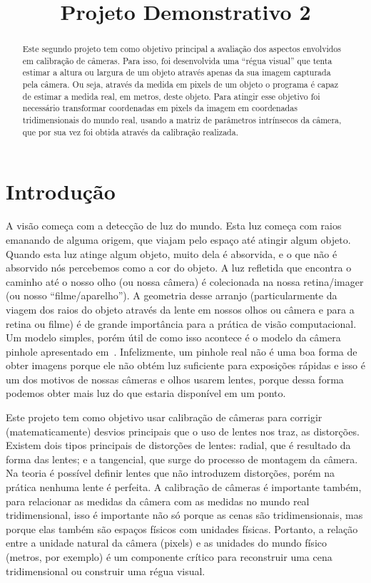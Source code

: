 \documentclass{bmvc2k}
\title{Projeto Demonstrativo 2}
\begin{document}
\maketitle

\begin{abstract}
Este segundo projeto tem como objetivo principal a avaliação dos aspectos envolvidos em calibração de câmeras. Para isso, foi desenvolvida uma ``régua visual'' que tenta estimar a altura ou largura de um objeto através apenas da sua imagem capturada pela câmera. Ou seja, através da medida em pixels de um objeto o programa é capaz de estimar a medida real, em metros, deste objeto. Para atingir esse objetivo foi necessário transformar coordenadas em pixels da imagem em coordenadas tridimensionais do mundo real, usando a matriz de parâmetros intrínsecos da câmera, que por sua vez foi obtida através da calibração realizada.
\end{abstract}

\section{Introdução}
\label{sec:intro}
A visão começa com a detecção de luz do mundo. Esta luz começa com raios emanando de alguma origem, que viajam pelo espaço até atingir algum objeto. Quando esta luz atinge algum objeto, muito dela é absorvida, e o que não é absorvido nós percebemos como a cor do objeto. A luz refletida que encontra o caminho até o nosso olho (ou nossa câmera) é colecionada na nossa retina/imager (ou nosso ``filme/aparelho''). A geometria desse arranjo (particularmente da viagem dos raios do objeto através da lente em nossos olhos ou câmera e para a retina ou filme) é de grande importância para a prática de visão computacional. Um modelo simples, porém útil de como isso acontece é o modelo da câmera pinhole apresentado em~\cite{Hartley}. Infelizmente, um pinhole real não é uma boa forma de obter imagens porque ele não obtém luz suficiente para exposições rápidas e isso é um dos motivos de nossas câmeras e olhos usarem lentes, porque dessa forma podemos obter mais luz do que estaria disponível em um ponto.

Este projeto tem como objetivo usar calibração de câmeras para corrigir (matematicamente) desvios principais que o uso de lentes nos traz, as distorções. Existem dois tipos principais de distorções de lentes: radial, que é resultado da forma das lentes; e a tangencial, que surge do processo de montagem da câmera. Na teoria é possível definir lentes que não introduzem distorções, porém na prática nenhuma lente é perfeita. A calibração de câmeras é importante também, para relacionar as medidas da câmera com as medidas no mundo real tridimensional, isso é importante não só porque as cenas são tridimensionais, mas porque elas também são espaços físicos com unidades físicas. Portanto, a relação entre a unidade natural da câmera (pixels) e as unidades do mundo físico (metros, por exemplo) é um componente crítico para reconstruir uma cena tridimensional ou construir uma régua visual.
\end{document}
